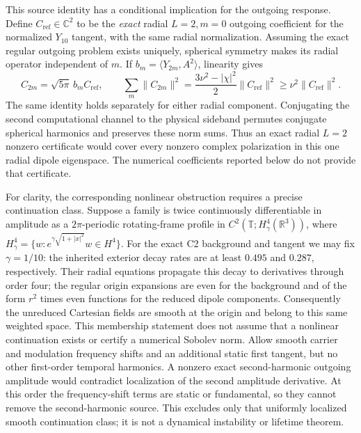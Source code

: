 This source identity has a conditional implication for the outgoing
response. Define $C_{\mathrm{ref}}\in\mathbb C^2$ to be the \emph{exact}
radial $L=2,m=0$ outgoing coefficient for the normalized $Y_{10}$ tangent,
with the same radial normalization. Assuming the exact regular outgoing
problem exists uniquely, spherical symmetry makes its radial operator
independent of $m$. If $b_m=\langle Y_{2m},A^2\rangle$, linearity gives
\begin{equation}
 C_{2m}=\sqrt{5\pi}\,b_m C_{\mathrm{ref}},\qquad
 \sum_m\|C_{2m}\|^2
 =\frac{3\nu^2-|\chi|^2}{2}\|C_{\mathrm{ref}}\|^2
 \geq\nu^2\|C_{\mathrm{ref}}\|^2.
 \label{nl:polarization-response}
\end{equation}
The same identity holds separately for either radial component.
Conjugating the second computational channel to the physical sideband
permutes conjugate spherical harmonics and preserves these norm sums.
Thus an exact radial $L=2$ nonzero certificate would cover every nonzero
complex polarization in this one radial dipole eigenspace. The numerical
coefficients reported below do not provide that certificate.

For clarity, the corresponding nonlinear obstruction requires a precise
continuation class. Suppose a family is twice continuously differentiable
in amplitude as a $2\pi$-periodic rotating-frame profile in
$C^2(\mathbb T;H^4_\gamma(\mathbb R^3))$, where
$H^4_\gamma=\{w:e^{\gamma\sqrt{1+|x|^2}}w\in H^4\}$.
For the exact C2 background and tangent we may fix $\gamma=1/10$:
the inherited exterior decay rates are at least $0.495$ and $0.287$,
respectively. Their radial equations propagate this decay to derivatives
through order four; the regular origin expansions are even for the
background and of the form $r^2$ times even functions for the reduced
dipole components. Consequently the unreduced Cartesian fields are
smooth at the origin and belong to this same weighted space.
This membership statement does not assume that a nonlinear continuation
exists or certify a numerical Sobolev norm. Allow smooth
carrier and modulation frequency shifts and an additional static first
tangent, but no other first-order temporal harmonics. A nonzero exact
second-harmonic outgoing amplitude would contradict localization of the
second amplitude derivative. At this order the frequency-shift terms
are static or fundamental, so they cannot remove the second-harmonic
source. This excludes only that uniformly localized smooth continuation
class; it is not a dynamical instability or lifetime theorem.

